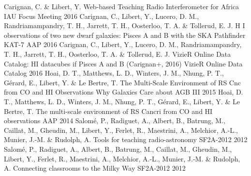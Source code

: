 

\begin{cventries}

  \cventry
    {Carignan, C. \& Libert, Y.}
    {Web-based Teaching Radio Interferometer for Africa}
    {IAU Focus Meeting}  
    {2016} 
    {}
  \cventry
    {Carignan, C., Libert, Y., Lucero, D. M., Randriamampandry, T. H., Jarrett, T. H., Oosterloo, T. A. \& Tollerud, E. J.}
    {H I observations of two new dwarf galaxies: Pisces A and B with the SKA Pathfinder KAT-7}
    {AAP}
    {2016}
    {}
  \cventry
    {Carignan, C., Libert, Y., Lucero, D. M., Randriamampandry, T. H., Jarrett, T. H., Oosterloo, T. A. \& Tollerud, E. J.}
    {VizieR Online Data Catalog: HI datacubes if Pisces A and B (Carignan+, 2016)}
    {VizieR Online Data Catalog}
    {2016} 
    {}
 \cventry 
    {Hoai, D. T., Matthews, L. D., Winters, J. M., Nhung, P. T., Gérard, E., Libert, Y. \& Le Bertre, T.}
    {The Multi-Scale Environment of RS Cnc from CO and HI Observations}
    {Why Galaxies Care about AGB III}  
    {2015}
    {}
  \cventry 
    {Hoai, D. T., Matthews, L. D., Winters, J. M., Nhung, P. T., Gérard, E., Libert, Y. \& Le Bertre, T.}
    {The multi-scale environment of RS Cancri from CO and HI observations}
    {AAP}
    {2014}
    {}
  \cventry 
    {Salomé, P., Radiguet, A., Albert, B., Batrung, M., Caillat, M., Gheudin, M., Libert, Y., Ferlet, R., Maestrini, A., Melchior, A.-L., Munier, J.-M. \& Rudolph, A.}
    {Tools for teaching radio-astronomy}
    {SF2A-2012}  
    {2012} 
    {}
  \cventry 
    {Salomé, P., Radiguet, A., Albert, B., Batrung, M., Caillat, M., Gheudin, M., Libert, Y., Ferlet, R., Maestrini, A., Melchior, A.-L., Munier, J.-M. \& Rudolph, A.}
    {Connecting classrooms to the Milky Way}
    {SF2A-2012}  
    {2012}
    {}

\end{cventries}
